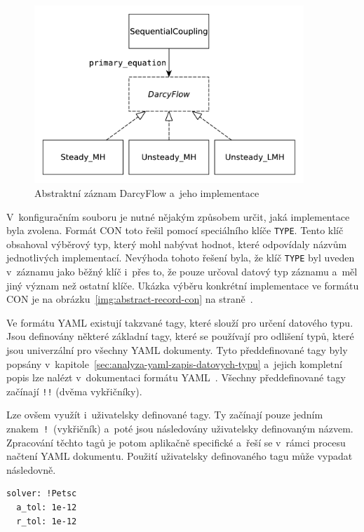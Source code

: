 \documentclass[FM,bw,DP]{tulthesis}
\begin{document}
\begin{figure}[h]
	\centering
    \includegraphics[height=190pt]{../img/abstract_record_darcyflow.pdf}
    \caption{Abstraktní záznam DarcyFlow a~jeho implementace}
	\label{img:abstract_record_darcyflow}
\end{figure}

V~konfiguračním souboru je nutné nějakým způsobem určit, jaká implementace byla zvolena. Formát \gls{CON} toto řešil pomocí speciálního klíče \texttt{TYPE}. Tento klíč obsahoval výběrový typ, který mohl nabývat hodnot, které odpovídaly názvům jednotlivých implementací. Nevýhoda tohoto řešení byla, že klíč \texttt{TYPE} byl uveden v~záznamu jako běžný klíč i~přes to, že pouze určoval datový typ záznamu a~měl jiný význam než ostatní klíče. Ukázka výběru konkrétní implementace ve formátu CON je na obrázku~\ref{img:abstract-record-con} na straně~\pageref{img:abstract-record-con}.

Ve formátu \gls{YAML} existují takzvané tagy, které slouží pro určení datového typu. Jsou definovány některé základní tagy, které se používají pro odlišení typů, které jsou univerzální pro všechny \gls{YAML} dokumenty. Tyto předdefinované tagy byly popsány v~kapitole~\ref{sec:analyza-yaml-zapis-datovych-typu} a~jejich kompletní popis lze nalézt v~dokumentaci formátu YAML~\cite{bib:yaml}. Všechny předdefinované tagy začínají \texttt{!!} (dvěma vykřičníky).

Lze ovšem využít i~uživatelsky definované tagy. Ty začínají pouze jedním znakem~\texttt{!}~(vykřičník) a~poté jsou následovány uživatelsky definovaným názvem. Zpracování těchto tagů je potom aplikačně specifické a~řeší se v~rámci procesu načtení \gls{YAML} dokumentu. Použití uživatelsky definovaného tagu může vypadat následovně.

\lstset{style=short}
\vspace{5pt}
\begin{lstlisting}
solver: !Petsc
  a_tol: 1e-12
  r_tol: 1e-12
\end{lstlisting}
\vspace{-20pt}
\end{document}
